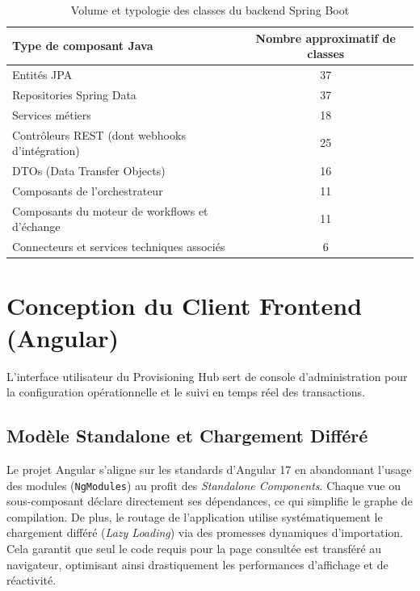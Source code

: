 \begin{table}[H]
    \centering
    \caption{Volume et typologie des classes du backend Spring Boot}
    \label{tab:statistiques_code}
    \begin{tabular}{lc}
        \toprule
        \textbf{Type de composant Java} & \textbf{Nombre approximatif de classes} \\
        \midrule
        Entités JPA & 37 \\
        Repositories Spring Data & 37 \\
        Services métiers & 18 \\
        Contrôleurs REST (dont webhooks d'intégration) & 25 \\
        DTOs (Data Transfer Objects) & 16 \\
        Composants de l'orchestrateur & 11 \\
        Composants du moteur de workflows et d'échange & 11 \\
        Connecteurs et services techniques associés & 6 \\
        \bottomrule
    \end{tabular}
\end{table}

\section{Conception du Client Frontend (Angular)}
L'interface utilisateur du Provisioning Hub sert de console d'administration pour la configuration opérationnelle et le suivi en temps réel des transactions.

\subsection{Modèle Standalone et Chargement Différé}
Le projet Angular s'aligne sur les standards d'Angular 17 en abandonnant l'usage des modules (\texttt{NgModules}) au profit des \textit{Standalone Components}. Chaque vue ou sous-composant déclare directement ses dépendances, ce qui simplifie le graphe de compilation. 
De plus, le routage de l'application utilise systématiquement le chargement différé (\textit{Lazy Loading}) via des promesses dynamiques d'importation. Cela garantit que seul le code requis pour la page consultée est transféré au navigateur, optimisant ainsi drastiquement les performances d'affichage et de réactivité.

